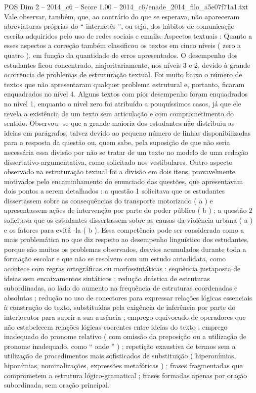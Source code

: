 \begin{textsample}{POS Dim 2 – 2014\_c6 – Score 1.00 – 2014\_c6/enade\_2014\_filo\_a5e07f71a1.txt}
Vale observar, também, que, ao contrário do que se esperava, não apareceram abreviaturas próprias do “ internetês ”, ou seja, dos hábitos de comunicação escrita adquiridos pelo uso de redes sociais e emails.
Aspectos textuais : Quanto a esses aspectos a correção também classificou os textos em cinco níveis ( zero a quatro ), em função da quantidade de erros apresentados.
O desempenho dos estudantes ficou concentrado, majoritariamente, nos níveis 3 e 2, devido à grande ocorrência de problemas de estruturação textual.
Foi muito baixo o número de textos que não apresentaram qualquer problema estrutural e, portanto, ficaram enquadrados no nível 4.
Alguns textos com pior desempenho foram enquadrados no nível 1, enquanto o nível zero foi atribuído a pouquíssimos casos, já que ele revela a existência de um texto sem articulação e com comprometimento do sentido.
Observou -se que a grande maioria dos estudantes não distribuiu as ideias em parágrafos, talvez devido ao pequeno número de linhas disponibilizadas para a resposta da questão ou, quem sabe, pela suposição de que não seria necessária essa divisão por não se tratar de um texto no modelo de uma redação dissertativo-argumentativa, como solicitado nos vestibulares.
Outro aspecto observado na estruturação textual foi a divisão em dois itens, provavelmente motivados pelo encaminhamento do enunciado das questões, que apresentavam dois pontos a serem detalhados : a questão 1 solicitava que os estudantes dissertassem sobre as consequências do transporte motorizado ( a ) e apresentassem ações de intervenção por parte do poder público ( b ) ; a questão 2 solicitava que os estudantes dissertassem sobre as causas da violência urbana ( a ) e os fatores para evitá -la ( b ).
Essa competência pode ser considerada como a mais problemática no que diz respeito ao desempenho linguístico dos estudantes, porque são muitos os problemas observados, desvios acumulados durante toda a formação escolar e que não se resolvem com um estudo autodidata, como acontece com regras ortográficas ou morfossintáticas : sequência justaposta de ideias sem encaixamentos sintáticos ; redução drástica de estruturas subordinadas, ao lado do aumento na frequência de estruturas coordenadas e absolutas ; redução no uso de conectores para expressar relações lógicas essenciais à construção do texto, substituídas pela exigência de inferência por parte do interlocutor para suprir a sua ausência ; emprego equivocado de operadores que não estabelecem relações lógicas coerentes entre ideias do texto ; emprego inadequado do pronome relativo ( com omissão da preposição ou a utilização de pronome inadequado, como “ onde ” ) ; repetição exaustiva de termos sem a utilização de procedimentos mais sofisticados de substituição ( hiperonímias, hiponímias, nominalizações, expressões metafóricas ) ; frases fragmentadas que comprometem a estrutura lógico-gramatical ; frases formadas apenas por oração subordinada, sem oração principal.

\end{textsample}
